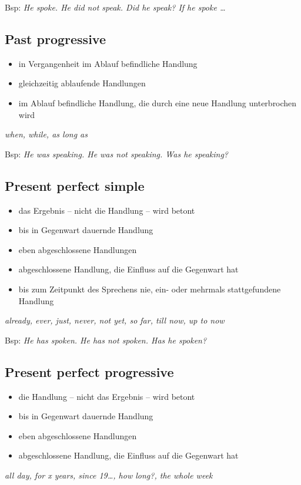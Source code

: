 Bsp: \textit{He spoke. He did not speak. Did he speak? If he spoke \dots}

\subsection{Past progressive}
\begin{itemize}\itemsep0em
	\item in Vergangenheit im Ablauf befindliche Handlung
	\item gleichzeitig ablaufende Handlungen
	\item im Ablauf befindliche Handlung, die durch eine neue Handlung unterbrochen wird
\end{itemize}
\textit{when, while, as long as}

Bsp: \textit{He  was speaking. He was not speaking. Was he speaking?}

\subsection{Present perfect simple}
\begin{itemize}\itemsep0em
	\item das Ergebnis -- nicht die Handlung -- wird betont
	\item bis in Gegenwart dauernde Handlung
	\item eben abgeschlossene Handlungen
	\item abgeschlossene Handlung, die Einfluss auf die Gegenwart hat
	\item bis zum Zeitpunkt des Sprechens nie, ein- oder mehrmals stattgefundene Handlung
\end{itemize}
\textit{already, ever, just, never, not yet, so far, till now, up to now}

Bsp: \textit{He  has spoken. He has not spoken. Has he spoken?}

\subsection{Present perfect progressive}
\begin{itemize}\itemsep0em
	\item die Handlung -- nicht das Ergebnis -- wird betont
	\item bis in Gegenwart dauernde Handlung
	\item eben abgeschlossene Handlungen
	\item abgeschlossene Handlung, die Einfluss auf die Gegenwart hat
\end{itemize}
\textit{all day, for x years, since 19\dots, how long?, the whole week}

